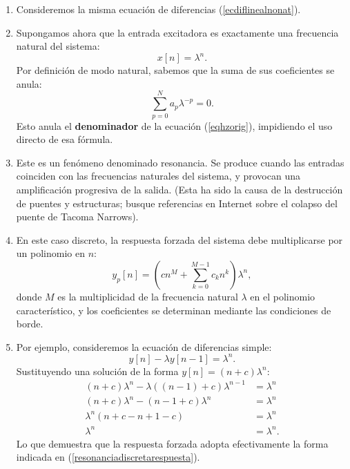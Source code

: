 \documentclass[11pt,a4paper,openany]{book}
\begin{document}
\begin{enumerate}
	\item Consideremos la misma ecuaci\'{o}n de diferencias (\ref{ecdiflinealnonat}).
	\item Supongamos ahora que la entrada excitadora es exactamente una frecuencia natural del sistema:
	\begin{equation}
		x[n] = \lambda^{n}.
	\end{equation}
	Por definición de modo natural, sabemos que la suma de sus coeficientes se anula:
	\begin{equation}
		\sum_{p=0}^{N}a_{p} \lambda^{-p} = 0.
	\end{equation}
	Esto anula el \textbf{denominador} de la ecuación (\ref{eqhzorig}), impidiendo el uso directo de esa fórmula.
	
	\item Este es un fen\'{o}meno denominado resonancia. Se produce cuando las entradas coinciden con las frecuencias naturales del sistema, y provocan una amplificaci\'{o}n progresiva de la salida. (Esta ha sido la causa de la destrucci\'{o}n de puentes y estructuras; busque referencias en Internet sobre el colapso del puente de Tacoma Narrows).
	
	\item En este caso discreto, la respuesta forzada del sistema debe multiplicarse por un polinomio en $n$:
	\begin{equation}
		y_{p}[n] = \left( c n^{M} + \sum_{k=0}^{M-1} c_{k} n^{k} \right) \lambda^{n}, \label{resonanciadiscreta}
	\end{equation}
	donde $M$ es la multiplicidad de la frecuencia natural $\lambda$ en el polinomio característico, y los coeficientes se determinan mediante las condiciones de borde.
	
	\item Por ejemplo, consideremos la ecuaci\'{o}n de diferencias simple:
	\begin{equation}
		y[n] - \lambda y[n-1] = \lambda^{n}.
	\end{equation}
	Sustituyendo una solución de la forma $y[n] = (n + c) \lambda^{n}$:
	\begin{align}
		(n + c) \lambda^{n} - \lambda ((n - 1) + c) \lambda^{n-1} &= \lambda^{n} \\
		(n + c) \lambda^{n} - (n - 1 + c) \lambda^{n} &= \lambda^{n} \\
		\lambda^{n} (n + c - n + 1 - c) &= \lambda^{n} \\
		\lambda^{n} &= \lambda^{n}.
	\end{align}
	Lo que demuestra que la respuesta forzada adopta efectivamente la forma indicada en (\ref{resonanciadiscretarespuesta}).
\end{enumerate}
\end{document}
